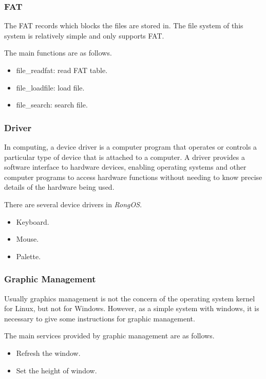 \documentclass{beamer}
\begin{document}
\begin{frame}
  \frametitle{FAT}
  The FAT records which blocks the files are stored in. The file system of this system is
  relatively simple and only supports FAT.

  The main functions are as follows.
  \begin{itemize}
  \item file\_readfat: read FAT table.
  \item file\_loadfile: load file.
  \item file\_search: search file.
  \end{itemize}
  
  
\end{frame}

\begin{frame}
  \frametitle{Driver}
  In computing, a device driver is a computer program that operates or controls a
  particular type of device that is attached to a computer. A driver provides a software
  interface to hardware devices, enabling operating systems and other computer programs to
  access hardware functions without needing to know precise details of the hardware being
  used.

  There are several device drivers in \emph{RongOS}.
  \begin{itemize}
  \item Keyboard.
  \item Mouse.
  \item Palette.
  \end{itemize}
\end{frame}
\begin{frame}
  \frametitle{Graphic Management}
  Usually graphics management is not the concern of the operating system kernel for Linux, but not for Windows. However,
  as a simple system with windows, it is necessary to give some instructions for graphic
  management.

  The main services provided by graphic management are as follows.
  \begin{itemize}
  \item Refresh the window.
  \item Set the height of window.
  \end{itemize}
  
\end{frame}
\end{document}
